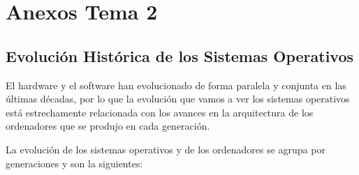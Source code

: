 \chapter{Anexos Tema 2}
\section{Evolución Histórica de los Sistemas Operativos}
\label{app:evol}
El hardware y el software han evolucionado de forma paralela y conjunta en las últimas décadas, por lo que la evolución que vamos a ver los sistemas operativos está estrechamente relacionada con los avances en la arquitectura de los ordenadores que se produjo en cada generación.

La evolución de los sistemas operativos y de los ordenadores se agrupa por generaciones y son la siguientes:

